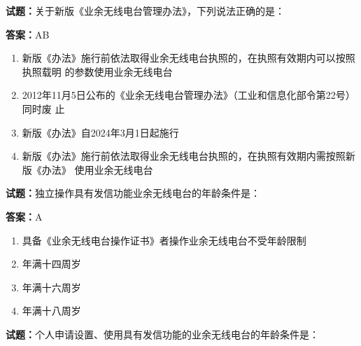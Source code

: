 \documentclass{ctexbook}
\begin{document}




\vspace{1em}

\textbf{试题：}关于新版《业余无线电台管理办法》，下列说法正确的是： 

\textbf{答案：}AB 

\begin{enumerate}[leftmargin=3em]
  \item 新版《办法》施行前依法取得业余无线电台执照的，在执照有效期内可以按照执照载明
的参数使用业余无线电台 

  \item 2012年11月5日公布的《业余无线电台管理办法》（工业和信息化部令第22号）同时废
止 

  \item 新版《办法》自2024年3月1日起施行 

  \item 新版《办法》施行前依法取得业余无线电台执照的，在执照有效期内需按照新版《办法》
使用业余无线电台 

\end{enumerate}





\vspace{1em}

\textbf{试题：}独立操作具有发信功能业余无线电台的年龄条件是： 

\textbf{答案：}A 

\begin{enumerate}[leftmargin=3em]
  \item 具备《业余无线电台操作证书》者操作业余无线电台不受年龄限制 

  \item 年满十四周岁 

  \item 年满十六周岁 

  \item 年满十八周岁 

\end{enumerate}





\vspace{1em}

\textbf{试题：}个人申请设置、使用具有发信功能的业余无线电台的年龄条件是： 
\end{document}
